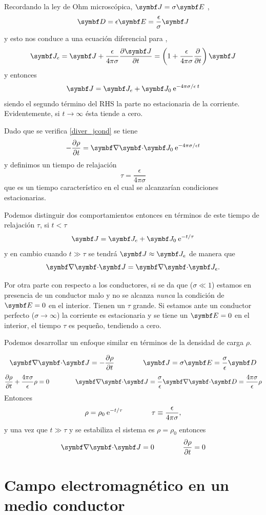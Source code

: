 \documentclass[10pt,oneside]{CBFT_book}
\begin{document}
Recordando la ley de Ohm microscópica, $\vb{J} = \sigma \vb{E}$ ,
\[
	\vb{D} = \epsilon \vb{E} = \frac{\epsilon}{\sigma} \vb{J}
\]
y esto nos conduce a una ecuación diferencial para ,
\[
	\vb{J}_e = \vb{J} + \frac{\epsilon}{4\pi\sigma} \dpar{\vb{J}}{t} =
	\left( 1 + \frac{\epsilon}{4\pi\sigma} \dpar{}{t} \right)\vb{J}
\]
y entonces 
\[
	\vb{J} = \vb{J}_e + \vb{J}_0 \euler^{-4\pi\sigma/\epsilon \: t }
\]
siendo el segundo término del RHS la parte no estacionaria de la corriente. 
Evidentemente, si $t \to \infty$ ésta tiende a cero.

Dado que se verifica \eqref{diver_jcond} se tiene 
\[
	-\dpar{\rho}{t} = \divem{J}_0 \euler^{-4\pi \sigma/\epsilon t}
\]
y definimos un tiempo de relajación
\[
	\tau = \frac{\epsilon}{4\pi\sigma}
\]
que es un tiempo característico en el cual se alcanzarían condiciones estacionarias.

Podemos distinguir dos comportamientos entonces en términos de este tiempo de relajación $\tau$, si $t<\tau$
\[
	\vb{J} = \vb{J}_e + \vb{J}_0 \euler^{-t/\tau}
\]
y en cambio cuando $t \gg \tau$ se tendrá $\vb{J} \approx \vb{J}_e$ de manera que 
\[
	\divem{J} = \divem{J}_e.
\]

Por otra parte con respecto a los conductores, si se da que  ($\sigma \ll 1$) estamos en presencia de un conductor malo 
y no se alcanza {\it nunca} la condición de $\vb{E}=0$ en el interior. Tienen un $\tau$ grande. Si estamos ante un 
conductor perfecto ($\sigma \to \infty$) la corriente es estacionaria y se tiene un $\vb{E}=0$ en el interior, el 
tiempo $\tau$ es pequeño, tendiendo a cero.

Podemos desarrollar un enfoque similar en términos de la densidad de carga $\rho$.

\[
	\divem{J} = - \dpar{\rho}{t}  \qquad \qquad \vb{J} = \sigma \vb{E} = \frac{\sigma}{\epsilon}\vb{D}
\]
\[
	\dpar{\rho}{t} + \frac{4\pi\sigma}{\epsilon} \rho = 0 \qquad \qquad 
			\divem{J} = \frac{\sigma}{\epsilon} \divem{D} = \frac{4\pi\sigma}{\epsilon} \rho
\]
Entonces 
\[
	\rho = \rho_0 \:\mathrm{e}^{-t / \tau } \qquad \qquad \tau \equiv \frac{\epsilon}{4\pi\sigma} ,
\]
y una vez que $t \gg \tau$ y se estabiliza el sistema es $\rho=\rho_0$ entonces 
\[
	\divem{J} = 0 \qquad\qquad \dpar{\rho}{t} = 0
\]


\section{Campo electromagnético en un medio conductor}
\end{document}
